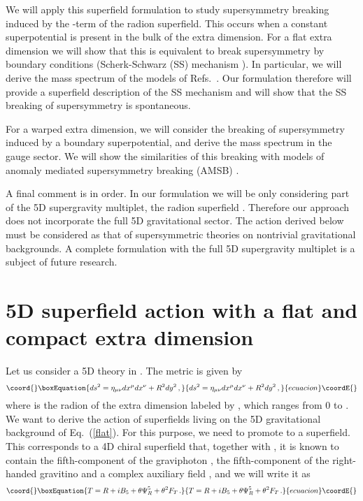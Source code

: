 \documentclass[a4paper,12pt]{article}
\providecommand{\Ft}{F_{T}}
\begin{document}
We will apply this superfield formulation to
study supersymmetry  breaking induced by the  \coordHE{}-term of the 
radion superfield. 
This occurs when a constant superpotential
is present in the bulk of the extra dimension.
For a flat extra dimension
we will show that 
this is equivalent to break  supersymmetry by boundary conditions
(Scherk-Schwarz (SS) mechanism \cite{ss}).
In particular, we will derive the  mass spectrum of the models of 
Refs.~\cite{pq,bhn}.
Our formulation therefore will provide a superfield
description of 
the SS mechanism and will show that 
the SS  breaking of supersymmetry is spontaneous.

For a warped extra dimension, we will consider the 
breaking of supersymmetry induced by a  boundary superpotential,
and derive the mass spectrum in the gauge sector.
We will show the similarities of this  breaking
with
 models of anomaly mediated supersymmetry breaking (AMSB) 
\cite{amsb}.

A final comment is in order.
In our formulation we will be only considering part 
of the 5D supergravity multiplet, 
the radion superfield \coordHE{}. 
Therefore our approach does not incorporate the full
5D gravitational sector.
The action derived below
must be considered as that of 
supersymmetric theories on  nontrivial gravitational backgrounds.
A complete formulation with the full 5D supergravity multiplet is
a subject of future research.



\section{5D superfield action with  a flat and compact extra dimension}

Let us  consider a 5D theory  in \coordHE{}.
The  metric is given by
\begin{equation}\coord{}\boxEquation{
    ds^2 = \eta_{\mu\nu} dx^\mu dx^\nu + R^2 dy^2 \, ,
\label{flat}
}{
    ds^2 = \eta_{\mu\nu} dx^\mu dx^\nu + R^2 dy^2 \, ,
}{ecuacion}\coordE{}\end{equation}
where \coordHE{} is the radion of the extra dimension labeled by \coordHE{}, which
ranges from 0 to \myHighlight{$2\pi$}\coordHE{}.  We want to derive the action of 
superfields living on the 5D gravitational background of
Eq.~(\ref{flat}).
For this purpose, we need to promote \coordHE{} to a superfield.  
This
corresponds to a 4D chiral superfield \coordHE{} that, together with \coordHE{}, it
is known to contain the fifth-component of the graviphoton \coordHE{}, the
fifth-component of the right-handed gravitino \coordHE{}
and a complex auxiliary field \coordHE{}, and we will write it as
\begin{equation}\coord{}\boxEquation{
 T=  R + i B_{5} + \theta \Psi^5_R + \theta^{2} \Ft\, .
}{
 T=  R + i B_{5} + \theta \Psi^5_R + \theta^{2} \Ft\, .
}{ecuacion}\coordE{}\end{equation}
\end{document}
